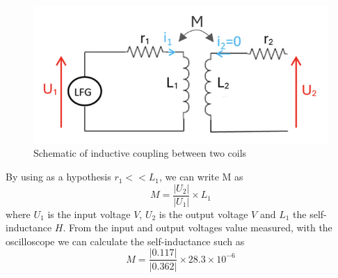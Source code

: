 \documentclass[conference]{IEEEtran}
\begin{document}
\begin{figure}[htbp]
	\centerline{\includegraphics[width=\linewidth]{images/24.png}}
	\caption{Schematic of inductive coupling between two coils}
	\label{fig}
\end{figure}
By using as a hypothesis \(r_1 << L_1\), we can write M as
$$ M = \frac{|U_2|}{|U_1|} \times L_1 $$
where \(U_1\) is the input voltage \(V\), \(U_2\) is the output voltage \(V\) and \(L_1\) the self-inductance
\(H\).
From the input and output voltages value measured, with the oscilloscope we can
calculate the self-inductance such as
$$ M = \frac{|0.117|}{|0.362|} \times 28.3 \times 10^{-6} $$
\end{document}
